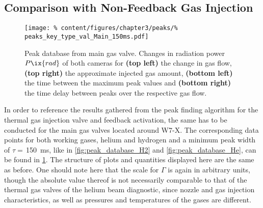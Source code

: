     \subsection{Comparison with Non-Feedback Gas Injection}\label{sec:compmainvalve}%
%
        \begin{figure}[t]%
            \centering%
            \texttt{[image: \%
                content/figures/chapter3/peaks/\%
                peaks\_key\_type\_val\_Main\_150ms.pdf]}%
            \caption{Peak database from main gas valve. Changes in radiation power $P\ix{rad}$ of both cameras for \textbf{(top left)} the change in gas flow, \textbf{(top right)} the approximate injected gas amount, \textbf{(bottom left)} the time between the maximum peak values and \textbf{(bottom right)} the time delay between peaks over the respective gas flow.}\label{fig:peak_database_main}%
        \end{figure}%
%
        In order to reference the results gathered from the peak finding algorithm for the thermal gas injection valve and feedback activation, the same has to be conducted for the main gas valves located around W7-X. The corresponding data points for both working gases, helium and hydrogen and a minimum peak width of $\tau=$\,\SI{150}{\milli\second}, like in \cref{fig:peak_database_H2} and \cref{fig:peak_database_He}, can be found in \cref{fig:peak_database_main}. The structure of plots and quantities displayed here are the same as before. One should note here that the scale for $\Gamma$ is again in arbitrary units, though the absolute value thereof is not necessarily comparable to that of the thermal gas valves of the helium beam diagnostic, since nozzle and gas injection characteristics, as well as pressures and temperatures of the gases are different.\\%
